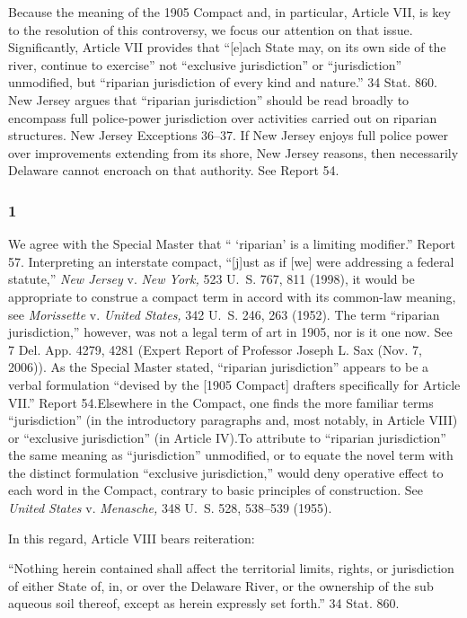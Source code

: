 {  Because the meaning of the 1905 Compact and, in particular, Article
VII, is key to the resolution of this controversy, we focus our
attention on that issue. Significantly, Article VII provides that
``[e]ach State may, on its own side of the river, continue to
exercise'' not ``exclusive jurisdiction'' or ``jurisdiction''
unmodified, but ``riparian jurisdiction of every kind and nature.''
34 Stat. 860. New Jersey argues that ``riparian jurisdiction''
should be read broadly to encompass full police-power jurisdiction over
activities carried out on riparian structures. New Jersey Exceptions
36--37. If New Jersey enjoys full police power over improvements
extending from its shore, New Jersey reasons, then necessarily Delaware
cannot encroach on that authority. See Report 54.

\subsubsection{1}

  We agree with the Special Master that `` ‘riparian' is a
limiting modifier.'' Report 57. Interpreting an interstate compact,
``[j]ust as if [we] were addressing a federal statute,'' \emph{New
Jersey} v. \emph{New York,} 523 U.~S. 767, 811 (1998), it would be
appropriate to construe a compact term in accord with its common-law
meaning, see \emph{Morissette} v. \emph{United States,} 342 U.~S. 246,
263 (1952). The term ``riparian jurisdiction,'' however, was not
a legal term of art in 1905, nor is it one now. See 7 Del. App.
4279, 4281 (Expert Report of Professor Jo\newpage seph L. Sax (Nov. 7,
2006)). As the Special Master stated, ``riparian jurisdiction''
appears to be a verbal formulation ``devised by the [1905 Compact]
drafters specifically for Article VII.'' Report 54.\footnotemark[13] Elsewhere
in the Compact, one finds the more familiar terms ``jurisdiction''
(in the introductory paragraphs and, most notably, in Article VIII)
or ``exclusive jurisdiction'' (in Article IV).\footnotemark[14] To attribute
to ``riparian jurisdiction'' the same meaning as ``jurisdiction''
unmodified, or to equate the novel term with the distinct formulation
``exclusive jurisdiction,'' would deny operative effect to each word
in the Compact, contrary to basic principles of construction. See
\emph{United States} v. \emph{Menasche,} 348 U.~S. 528, 538--539 (1955).

  In this regard, Article VIII bears reiteration:

    ``Nothing herein contained shall affect the territorial limits,
    rights, or jurisdiction of either State of, in, or over the Delaware
    River, or the ownership of the sub aqueous soil thereof, except as
    herein expressly set forth.'' 34 Stat. 860.

}
